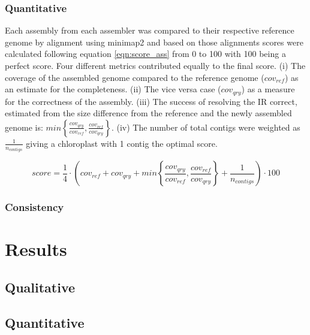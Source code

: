 \subsubsection{Quantitative}

Each assembly from each assembler was compared to their respective reference genome by alignment using
minimap2 \cite{li2018minimap2} and based on those alignments scores were calculated following equation
\ref{eqn:score_ass} from 0 to 100 with 100 being a perfect score. Four different metrics contributed equally
to the final score. (i) The coverage of the assembled genome compared to the reference genome ($cov_{ref}$) as
an estimate for the completeness. (ii) The vice versa case ($cov_{qry}$) as a measure for the correctness of
the assembly. (iii) The success of resolving the IR correct, estimated from the size difference from the
reference and the newly assembled genome is:
$min\left\{ \frac{cov_{qry}}{cov_{ref}}, \frac{cov_{ref}}{cov_{qry}}\right\}$.  (iv) The number of total
contigs were weighted as $\frac{1}{n_{contigs}}$ giving a chloroplast with 1 contig the optimal score.

\begin{equation}
score = \frac{1}{4} \cdot \left( cov_{ref} +  cov_{qry} + min\left\{ \frac{cov_{qry}}{cov_{ref}}, \frac{cov_{ref}}{cov_{qry}}\right\} + \frac{1}{n_{contigs} }\right) \cdot 100
  \label{eqn:score_ass}
\end{equation}
  
  
  
  
  \subsubsection{Consistency}
  

\section{Results} \label{results:ca}
\subsection{Qualitative}

\subsection{Quantitative}
